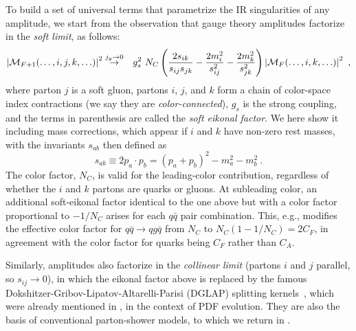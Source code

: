 To build a set of universal terms that parametrize the IR singularities of
any amplitude, we start from the observation that gauge theory
amplitudes factorize in the \emph{soft limit}, as follows:
\begin{eqnarray}
\left\vert{\cal M}_{F+1} (\ldots, i,j,k, \ldots )\right\vert^2
  & \stackrel{j_g\to 0}{\to} & g_s^2\ N_C \left( \frac{2 s_{ik}}{s_{ij}
  s_{jk}} - \frac{2m_i^2}{s_{ij}^2} - \frac{2 m_k^2}{s_{jk}^2}\right) 
\left\vert{\cal M}_{F} (\ldots, i,k, \ldots )\right\vert^2
~,\label{eq:eikonal}
\end{eqnarray}
%
where parton $j$ is a soft gluon, partons 
$i$, $j$, and $k$ form a chain of color-space index contractions 
(we say they are \emph{color-connected}), 
$g_s$ is the strong coupling, 
and the terms in parenthesis are 
%
%
%
called the \emph{soft eikonal factor}. We here show it including 
mass corrections, which appear if $i$ and $k$ have non-zero rest
masses, with the invariants 
$s_{ab}$ then defined as 
\begin{equation}
s_{ab} \equiv 2p_a\cdot p_b = (p_a+p_b)^2 - m_a^2 - m_b^2~.
\end{equation}
The color factor, $N_C$, is valid for the leading-color
contribution, regardless of whether the $i$ and $k$ partons are quarks
or gluons. At subleading color, an additional soft-eikonal
factor identical to the one above but with a color factor 
proportional to $-1/N_C$ arises for each $q\bar{q}$ pair
combination. 
This, e.g., modifies the effective color factor for $q\bar{q}\to
qg\bar{q}$ from $N_C$ to $N_C(1-1/N_C) = 2C_F$, in agreement with the
color factor for quarks being $C_F$ rather than $C_A$.

%
%
Similarly, amplitudes also factorize in the \emph{collinear limit}
(partons $i$ and $j$ parallel, so $s_{ij}\to 0$), in which
the eikonal factor above is replaced by the 
famous Dokshitzer-Gribov-Lipatov-Altarelli-Parisi (DGLAP)
splitting kernels~\cite{Gribov:1972ri,Altarelli:1977zs,Dokshitzer:1977sg}, 
which 
were already mentioned in , in 
the context of PDF evolution. 
They are also the basis of conventional 
parton-shower models, to which we return in . 

